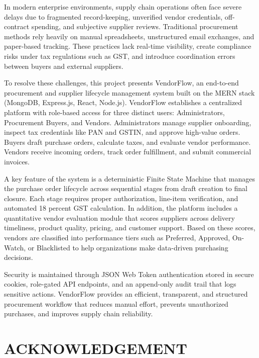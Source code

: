 \documentclass[12pt,a4paper,oneside]{report}
\begin{document}
In modern enterprise environments, supply chain operations often face severe delays due to fragmented record-keeping, unverified vendor credentials, off-contract spending, and subjective supplier reviews. Traditional procurement methods rely heavily on manual spreadsheets, unstructured email exchanges, and paper-based tracking. These practices lack real-time visibility, create compliance risks under tax regulations such as GST, and introduce coordination errors between buyers and external suppliers.

To resolve these challenges, this project presents VendorFlow, an end-to-end procurement and supplier lifecycle management system built on the MERN stack (MongoDB, Express.js, React, Node.js). VendorFlow establishes a centralized platform with role-based access for three distinct users: Administrators, Procurement Buyers, and Vendors. Administrators manage supplier onboarding, inspect tax credentials like PAN and GSTIN, and approve high-value orders. Buyers draft purchase orders, calculate taxes, and evaluate vendor performance. Vendors receive incoming orders, track order fulfillment, and submit commercial invoices.

A key feature of the system is a deterministic Finite State Machine that manages the purchase order lifecycle across sequential stages from draft creation to final closure. Each stage requires proper authorization, line-item verification, and automated 18 percent GST calculation. In addition, the platform includes a quantitative vendor evaluation module that scores suppliers across delivery timeliness, product quality, pricing, and customer support. Based on these scores, vendors are classified into performance tiers such as Preferred, Approved, On-Watch, or Blacklisted to help organizations make data-driven purchasing decisions.

Security is maintained through JSON Web Token authentication stored in secure cookies, role-gated API endpoints, and an append-only audit trail that logs sensitive actions. VendorFlow provides an efficient, transparent, and structured procurement workflow that reduces manual effort, prevents unauthorized purchases, and improves supply chain reliability.

\clearpage

\chapter*{ACKNOWLEDGEMENT}
\end{document}
